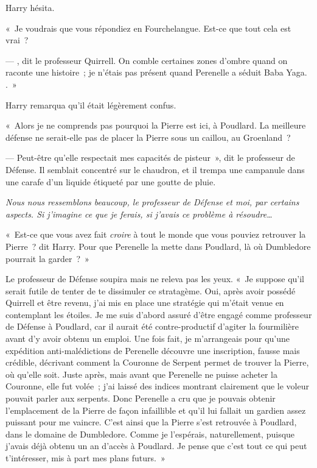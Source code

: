 Harry hésita.

«~Je voudrais que vous répondiez en Fourchelangue. Est-ce que tout cela est vrai~?

--- , dit le professeur Quirrell. On comble certaines zones d'ombre quand on raconte une histoire~; je n'étais pas présent quand Perenelle a séduit Baba Yaga. .~»

Harry remarqua qu'il était légèrement confus.

«~Alors je ne comprends pas pourquoi la Pierre est ici, à Poudlard. La meilleure défense ne serait-elle pas de placer la Pierre sous un caillou, au Groenland~?

--- Peut-être qu'elle respectait mes capacités de pisteur~», dit le professeur de Défense. Il semblait concentré sur le chaudron, et il trempa une campanule dans une carafe d'un liquide étiqueté par une goutte de pluie.

\emph{Nous nous ressemblons beaucoup, le professeur de Défense et moi, par certains aspects. Si j'imagine ce que je ferais, si j'avais ce problème à résoudre…}

«~Est-ce que vous avez fait \emph{croire} à tout le monde que vous pouviez retrouver la Pierre~? dit Harry. Pour que Perenelle la mette dans Poudlard, là où Dumbledore pourrait la garder~?~»

Le professeur de Défense soupira mais ne releva pas les yeux. «~Je suppose qu'il serait futile de tenter de te dissimuler ce stratagème. Oui, après avoir possédé Quirrell et être revenu, j'ai mis en place une stratégie qui m'était venue en contemplant les étoiles. Je me suis d'abord assuré d'être engagé comme professeur de Défense à Poudlard, car il aurait été contre-productif d'agiter la fourmilière avant d'y avoir obtenu un emploi. Une fois fait, je m'arrangeais pour qu'une expédition anti-malédictions de Perenelle découvre une inscription, fausse mais crédible, décrivant comment la Couronne de Serpent permet de trouver la Pierre, où qu'elle soit. Juste après, mais avant que Perenelle ne puisse acheter la Couronne, elle fut volée~; j'ai laissé des indices montrant clairement que le voleur pouvait parler aux serpents. Donc Perenelle a cru que je pouvais obtenir l'emplacement de la Pierre de façon infaillible et qu'il lui fallait un gardien assez puissant pour me vaincre. C'est ainsi que la Pierre s'est retrouvée à Poudlard, dans le domaine de Dumbledore. Comme je l'espérais, naturellement, puisque j'avais déjà obtenu un an d'accès à Poudlard. Je pense que c'est tout ce qui peut t'intéresser, mis à part mes plans futurs.~»

